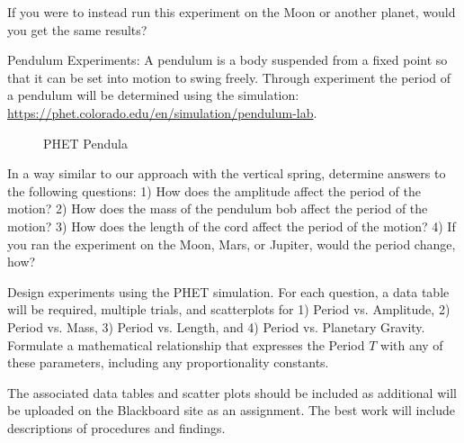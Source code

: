 \documentclass[14pt]{article}
\newcommand{\subheading}[1]{{\boldtenrm #1}}
\begin{document}
If you were to instead run this experiment on the Moon or another planet, would you get the same results?


\subheading{Pendulum Experiments}: A pendulum is a body suspended from a fixed point so that it can be set into motion to swing freely.  Through experiment the period of a pendulum will be determined %
using the simulation: \url{https://phet.colorado.edu/en/simulation/pendulum-lab}.

\begin{figure}
    \centering
    \caption{PHET Pendula}
   \label{fig:pendula}
\end{figure}

In a way similar to our approach with the vertical spring,  determine answers to the following questions: 1) How does the amplitude affect the period of the motion? 2) How does the mass of the pendulum bob affect the period of the motion?  3) How does the length of the cord affect the period of the motion? 4) If you ran the experiment on the Moon, Mars, or Jupiter, would the period change, how?  

Design experiments using the PHET simulation. For each question, a data table will be required, multiple trials, and scatterplots for 1) Period vs. Amplitude, 2) Period vs. Mass, 3) Period vs. Length, and 4) Period vs. Planetary Gravity.  Formulate a mathematical relationship that expresses the Period $T$ with any of these parameters, including any proportionality constants.

The associated data tables and scatter plots should be included as additional will be uploaded on the Blackboard site as an assignment.  The best work will include descriptions of procedures and findings.

\newpage
\vphantom{}
\end{document}
